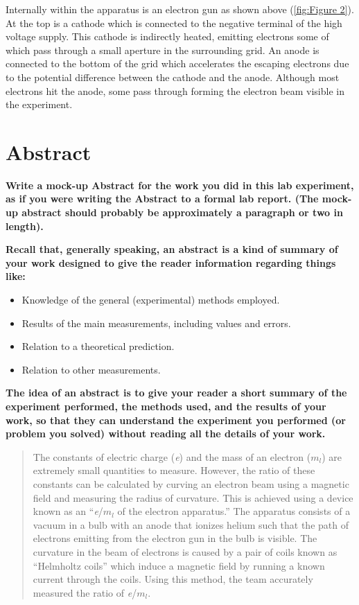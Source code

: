 \documentclass[prX,nofootinbib,notitlepage]{revtex4-1}
\begin{document}
Internally within the apparatus is an electron gun as shown above (\ref{fig:Figure 2}). At the top is a cathode which is connected to the negative terminal of the high voltage supply. This cathode is indirectly heated, emitting electrons some of which pass through a small aperture in the surrounding grid. An anode is connected to the bottom of the grid which accelerates the escaping electrons due to the potential difference between the cathode and the anode. Although most electrons hit the anode, some pass through forming the electron beam visible in the experiment. 

\section{Abstract}

\textbf{Write a mock-up Abstract for the work you did in this lab experiment, as if you were writing the Abstract to a formal lab report. (The mock-up abstract should probably be approximately a paragraph or two in length).}

\textbf{Recall that, generally speaking, an abstract is a kind of summary of your work designed to give the reader information regarding things like:}

\begin{itemize}
    \item Knowledge of the general (experimental) methods employed.
    \item Results of the main measurements, including values and errors.
    \item Relation to a theoretical prediction.
    \item Relation to other measurements.
\end{itemize}

\textbf{The idea of an abstract is to give your reader a short summary of the experiment performed, the methods used, and the results of your work, so that they can understand the experiment you performed (or problem you solved) without reading all the details of your work.}

\begin{abstract}
    The constants of electric charge (\textit{e}) and the mass of an electron (\textit{$m_l$}) are extremely small quantities to measure. However, the ratio of these constants can be calculated by curving an electron beam using a magnetic field and measuring the radius of curvature. This is achieved using a device known as an “\textit{e}/\textit{$m_l$} of the electron apparatus.” The apparatus consists of a vacuum in a bulb with an anode that ionizes helium such that the path of electrons emitting from the electron gun in the bulb is visible. The curvature in the beam of electrons is caused by a pair of coils known as “Helmholtz coils” which induce a magnetic field by running a known current through the coils. Using this method, the team accurately measured the ratio of \textit{e}/\textit{$m_l$}.
\end{abstract} 
\end{document}
